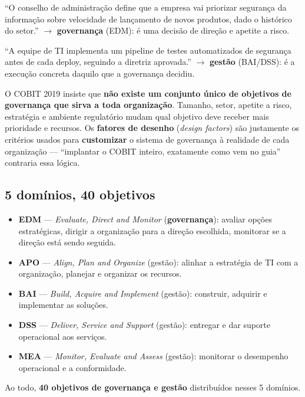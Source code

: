 \begin{exemplo}
“O conselho de administração define que a empresa vai priorizar segurança
da informação sobre velocidade de lançamento de novos produtos, dado o
histórico do setor.” $\to$ \textbf{governança} (EDM): é uma decisão de
direção e apetite a risco.

“A equipe de TI implementa um pipeline de testes automatizados de segurança
antes de cada deploy, seguindo a diretriz aprovada.” $\to$ \textbf{gestão}
(BAI/DSS): é a execução concreta daquilo que a governança decidiu.
\end{exemplo}

\begin{conceito}
O COBIT 2019 insiste que \textbf{não existe um conjunto único de objetivos
de governança que sirva a toda organização}. Tamanho, setor, apetite a
risco, estratégia e ambiente regulatório mudam qual objetivo deve receber
mais prioridade e recursos. Os \textbf{fatores de desenho}
(\textit{design factors}) são justamente os critérios usados para
\textbf{customizar} o sistema de governança à realidade de cada organização
--- “implantar o COBIT inteiro, exatamente como vem no guia” contraria essa
lógica.
\end{conceito}

\subsection{5 domínios, 40 objetivos}

\begin{conceito}
\begin{itemize}
\item \textbf{EDM} --- \textit{Evaluate, Direct and Monitor}
(\textbf{governança}): avaliar opções estratégicas, dirigir a organização
para a direção escolhida, monitorar se a direção está sendo seguida.
\item \textbf{APO} --- \textit{Align, Plan and Organize} (gestão): alinhar
a estratégia de TI com a organização, planejar e organizar os recursos.
\item \textbf{BAI} --- \textit{Build, Acquire and Implement} (gestão):
construir, adquirir e implementar as soluções.
\item \textbf{DSS} --- \textit{Deliver, Service and Support} (gestão):
entregar e dar suporte operacional aos serviços.
\item \textbf{MEA} --- \textit{Monitor, Evaluate and Assess} (gestão):
monitorar o desempenho operacional e a conformidade.
\end{itemize}
Ao todo, \textbf{40 objetivos de governança e gestão} distribuídos nesses 5
domínios.
\end{conceito}

